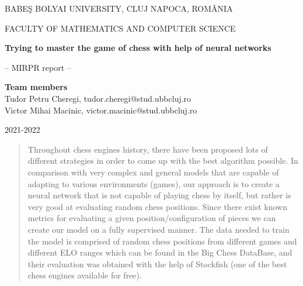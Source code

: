 \documentclass[runningheads,a4paper,11pt]{report}
\begin{document}
\begin{titlepage}
\sloppy

\begin{center}
BABE\c S BOLYAI UNIVERSITY, CLUJ NAPOCA, ROM\^ ANIA

FACULTY OF MATHEMATICS AND COMPUTER SCIENCE

\vspace{6cm}

\Huge \textbf{Trying to master the game of chess with help of neural networks}

\vspace{1cm}

\normalsize -- MIRPR report --

\end{center}


\vspace{5cm}

\begin{flushright}
\Large{\textbf{Team members}}\\
Tudor Petru Cheregi, tudor.cheregi@stud.ubbcluj.ro\\
Victor Mihai Macinic, victor.macinic@stud.ubbcluj.ro
\end{flushright}

\vspace{4cm}

\begin{center}
2021-2022
\end{center}

\end{titlepage}


\begin{abstract}
	    Throughout chess engines history, there have been proposed lots of different strategies in order to come up with the best algorithm possible. In comparison with very complex and general models that are capable of adapting to various environments (games), our approach is to create a neural network that is not capable of playing chess by itself, but rather is very good at evaluating random chess positions.
	    Since there exist known metrics for evaluating a given position/configuration of pieces
	    we can create our model on a fully supervised manner.
		The data needed to train the model is comprised of random chess positions from different games and different ELO ranges which can be found in the Big Chess DataBase, and their evaluation was obtained with the help of Stockfish (one of the best chess engines available for free).
\end{abstract}
\end{document}
